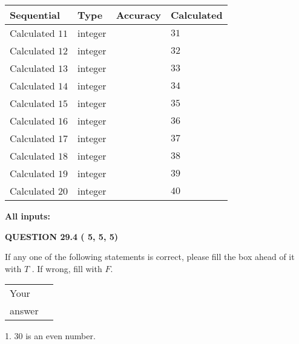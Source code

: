 \documentclass[12pt]{article}
\begin{document}
  
\noindent\begin{tabular}{|l|l|l|l|}
\hline
 Sequential & Type & Accuracy & Calculated \\ 
\hline
 
 
  Calculated $          11$ & integer &  & 
  $ 31 $ 
 \\  \hline  
 
 
  Calculated $          12$ & integer &  & 
  $ 32 $ 
 \\  \hline  
 
 
  Calculated $          13$ & integer &  & 
  $ 33 $ 
 \\  \hline  
 
 
  Calculated $          14$ & integer &  & 
  $ 34 $ 
 \\  \hline  
 
 
  Calculated $          15$ & integer &  & 
  $ 35 $ 
 \\  \hline  
 
 
  Calculated $          16$ & integer &  & 
  $ 36 $ 
 \\  \hline  
 
 
  Calculated $          17$ & integer &  & 
  $ 37 $ 
 \\  \hline  
 
 
  Calculated $          18$ & integer &  & 
  $ 38 $ 
 \\  \hline  
 
 
  Calculated $          19$ & integer &  & 
  $ 39 $ 
 \\  \hline  
 
 
  Calculated $          20$ & integer &  & 
  $ 40 $ 
 \\  \hline  
 \end{tabular}
   
   
   
   
\noindent\vspace{0.1in}\hspace{-0.08in} {\textbf{\Large{All inputs: }}}
   
   
  
\vspace{0.2in}
  
{\textbf{\Large{QUESTION
29.4 
 (          5,          5,          5)
}}}
  
  
If any one of the following statements is correct, please fill the box ahead of it with $T$ .
If wrong, fill with $F$.
 
\noindent\begin{tabular}{|l|l|}\hline Your&\hspace{.2in} \\ answer&\hspace{.2in} \\ \hline \end{tabular}
1. $ %
30$ is an  %
even number.
 
\end{document}
